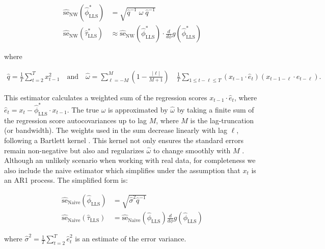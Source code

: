 \documentclass[main.tex]{subfiles}
\begin{document}
\begin{align}
\widehat{\text{se}}_{\text{NW}}(\hat\phi^*_{\scriptscriptstyle\text{LLS}}) &= \sqrt{\hat q^{-1}\;\hat\omega\; \hat q^{-1}}\\
\widehat{\text{se}}_{\text{NW}}(\hat\tau^*_{\scriptscriptstyle\text{LLS}}) &\approx \widehat{\text{se}}_{\text{NW}}(\hat\phi^*_{\scriptscriptstyle\text{LLS}}) \cdot \frac{d}{d\phi} g(\hat\phi^*_{\scriptscriptstyle\text{LLS}})
\end{align}

\noindent where

\begin{align}
    \hat q = \frac{1}{T} \sum_{t=2}^T x_{t-1}^2 \quad\text{and}\quad
    \hat \omega = \sum_{\ell=-M}^M (1 - \frac{|\ell|}{M+1}) \quad \frac{1}{T} \sum_{1\le t - \ell \le T} (x_{t-1} \cdot \hat e_t)(x_{t-1-\ell} \cdot \hat e_{t-\ell}).
\end{align}

This estimator calculates a weighted sum of the regression scores $x_{t-1} \cdot \hat e_t$, where $\hat e_t = x_t - \hat\phi^*_{\scriptscriptstyle\text{LLS}} \cdot x_{t-1}$. The true $\omega$ is approximated by $\hat \omega$ by taking a finite sum of the regression score autocovariances up to lag $M$, where $M$ is the lag-truncation (or bandwidth). The weights used in the sum decrease linearly with lag $\ell$, following a Bartlett kernel \citep{newey_simple_1987}. This kernel not only ensures the standard errors remain non-negative but also and regularizes $\hat \omega$ to change smoothly with $M$ \citep[chapter~14.35]{hansen_econometrics_2022}.\\


Although an unlikely scenario when working with real data, for completeness we also include the naive estimator which simplifies under the assumption that $x_t$ is an AR1 process. The simplified form is:

\begin{align} 
    \widehat{\text{se}}_\text{Naive}(\hat\phi_{\scriptscriptstyle\text{LLS}}) &= \sqrt{\hat\sigma^2 \hat q^{-1}}\\
    \widehat{\text{se}}_\text{Naive}(\hat\tau_{\scriptscriptstyle\text{LLS}}) &= \widehat{\text{se}}_{\text{Naive}}(\hat\phi_{\scriptscriptstyle\text{LLS}}) \frac{d}{d\phi} g(\hat\phi_{\scriptscriptstyle\text{LLS}})
\end{align}

\noindent where $\hat\sigma^2 = \frac{1}{T} \sum_{t=2}^T \hat e_t^2$ is an estimate of the error variance.
\end{document}
